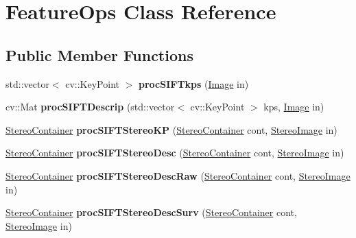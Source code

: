 \hypertarget{classFeatureOps}{}\section{Feature\+Ops Class Reference}
\label{classFeatureOps}
\subsection*{Public Member Functions}
\begin{DoxyCompactItemize}
\item 
std\+::vector$<$ cv\+::\+Key\+Point $>$ {\bfseries proc\+S\+I\+F\+Tkps} (\hyperlink{classImage}{Image} in)\hypertarget{classFeatureOps_abac47f19af7ca46525960cb561fafb7d}{}\label{classFeatureOps_abac47f19af7ca46525960cb561fafb7d}

\item 
cv\+::\+Mat {\bfseries proc\+S\+I\+F\+T\+Descrip} (std\+::vector$<$ cv\+::\+Key\+Point $>$ kps, \hyperlink{classImage}{Image} in)\hypertarget{classFeatureOps_a2e39c668b5db23aca71505d3db7161ba}{}\label{classFeatureOps_a2e39c668b5db23aca71505d3db7161ba}

\item 
\hyperlink{structStereoContainer}{Stereo\+Container} {\bfseries proc\+S\+I\+F\+T\+Stereo\+KP} (\hyperlink{structStereoContainer}{Stereo\+Container} cont, \hyperlink{classStereoImage}{Stereo\+Image} in)\hypertarget{classFeatureOps_a5b8f9899922e638bf004306c0ad95e6a}{}\label{classFeatureOps_a5b8f9899922e638bf004306c0ad95e6a}

\item 
\hyperlink{structStereoContainer}{Stereo\+Container} {\bfseries proc\+S\+I\+F\+T\+Stereo\+Desc} (\hyperlink{structStereoContainer}{Stereo\+Container} cont, \hyperlink{classStereoImage}{Stereo\+Image} in)\hypertarget{classFeatureOps_abeef0f8042b2026190ce2ebb76fa935d}{}\label{classFeatureOps_abeef0f8042b2026190ce2ebb76fa935d}

\item 
\hyperlink{structStereoContainer}{Stereo\+Container} {\bfseries proc\+S\+I\+F\+T\+Stereo\+Desc\+Raw} (\hyperlink{structStereoContainer}{Stereo\+Container} cont, \hyperlink{classStereoImage}{Stereo\+Image} in)\hypertarget{classFeatureOps_a3a372e7bc77b18075a5ca7ff91d5d295}{}\label{classFeatureOps_a3a372e7bc77b18075a5ca7ff91d5d295}

\item 
\hyperlink{structStereoContainer}{Stereo\+Container} {\bfseries proc\+S\+I\+F\+T\+Stereo\+Desc\+Surv} (\hyperlink{structStereoContainer}{Stereo\+Container} cont, \hyperlink{classStereoImage}{Stereo\+Image} in)\hypertarget{classFeatureOps_af80aae84e9210cd7996db89773c7b39e}{}\label{classFeatureOps_af80aae84e9210cd7996db89773c7b39e}


\end{DoxyCompactItemize}
